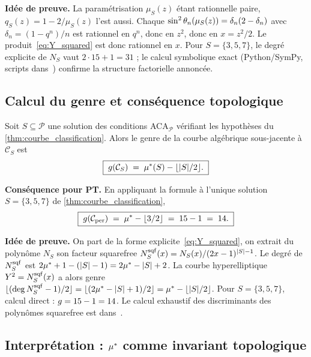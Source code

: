 \textbf{Idée de preuve.} La paramétrisation $\mu_S(z)$ étant rationnelle paire, $q_S(z) = 1 - 2/\mu_S(z)$ l'est aussi. Chaque $\sin^{2}\theta_{n}(\mu_S(z)) = \delta_n(2 - \delta_n)$ avec $\delta_n = (1 - q^{n})/n$ est rationnel en $q^{n}$, donc en $z^{2}$, donc en $x = z^{2}/2$. Le produit~\eqref{eq:Y_squared} est donc rationnel en $x$. Pour $S = \{3, 5, 7\}$, le degré explicite de $N_S$ vaut $2 \cdot 15 + 1 = 31$ ; le calcul symbolique exact (Python/SymPy, scripts dans~\cite{PT_GeoFlow_PersistenceCurve}) confirme la structure factorielle annoncée.

\subsection{Calcul du genre et conséquence topologique}
\label{sec:courbe:genre}

\begin{theoreme}
\label{thm:genre}
Soit $S \subseteq \mathcal P$ une solution des conditions ACA$_{\mathcal P}$ vérifiant les hypothèses du \ref{thm:courbe_classification}. Alors le genre de la courbe algébrique sous-jacente à $\mathcal C_S$ est
\[
\boxed{\;g(\mathcal C_S) \;=\; \mu^{*}(S) - \lfloor |S|/2 \rfloor.\;}
\]
\end{theoreme}

\textbf{Conséquence pour PT.} En appliquant la formule à l'unique solution $S = \{3, 5, 7\}$ de \ref{thm:courbe_classification},
\begin{equation}
\boxed{\;g(\mathcal{C}_{\rm per}) \;=\; \mu^{*} - \lfloor 3/2 \rfloor \;=\; 15 - 1 \;=\; 14.\;}
\label{eq:genus_14}
\end{equation}

\textbf{Idée de preuve.} On part de la forme explicite~\eqref{eq:Y_squared}, on extrait du polynôme $N_S$ son facteur squarefree $N_S^{\rm sqf}(x) = N_S(x)/(2x - 1)^{|S| - 1}$. Le degré de $N_S^{\rm sqf}$ est $2\mu^{*} + 1 - (|S| - 1) = 2\mu^{*} - |S| + 2$. La courbe hyperelliptique $Y^{2} = N_S^{\rm sqf}(x)$ a alors genre $\lfloor (\deg N_S^{\rm sqf} - 1)/2 \rfloor = \lfloor (2\mu^{*} - |S| + 1)/2 \rfloor = \mu^{*} - \lfloor |S|/2 \rfloor$. Pour $S = \{3, 5, 7\}$, calcul direct : $g = 15 - 1 = 14$. Le calcul exhaustif des discriminants des polynômes squarefree est dans~\cite[\S 7]{PT_GeoFlow_PersistenceCurve}.

\subsection{Interprétation : \texorpdfstring{$\mu^{*}$}{μ*} comme invariant topologique}
\label{sec:courbe:interpretation}


